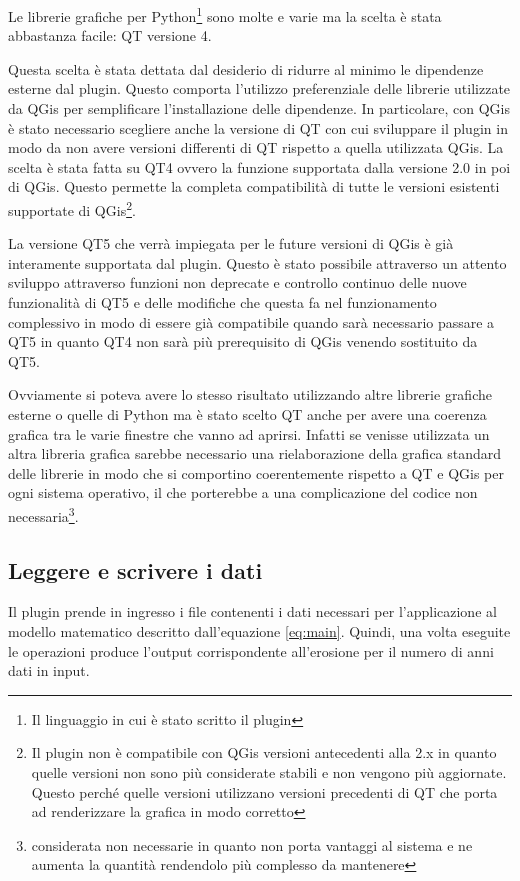 Le librerie grafiche per Python\footnote{Il linguaggio in cui è stato scritto il plugin} sono molte e varie ma la scelta è stata abbastanza facile: QT versione 4.

Questa scelta è stata dettata dal desiderio di ridurre al minimo le dipendenze esterne dal plugin. Questo comporta l'utilizzo preferenziale delle librerie utilizzate da QGis per semplificare l'installazione delle dipendenze. In particolare, con QGis è stato necessario scegliere anche la versione di QT con cui sviluppare il plugin in modo da non avere versioni differenti di QT rispetto a quella utilizzata QGis. La scelta è stata fatta su QT4 ovvero la funzione supportata dalla versione 2.0 in poi di QGis.  Questo permette la completa compatibilità di tutte le versioni esistenti supportate di QGis\footnote{Il plugin non è compatibile con QGis versioni antecedenti alla 2.x in quanto quelle versioni non sono più considerate stabili e non vengono più aggiornate. Questo perché quelle versioni utilizzano versioni precedenti di QT che porta ad renderizzare la grafica in modo corretto}.

La versione QT5 che verrà impiegata per le future versioni di QGis è già interamente supportata dal plugin. Questo è stato possibile attraverso un attento sviluppo attraverso funzioni non deprecate e controllo continuo delle nuove funzionalità di QT5 e delle modifiche che questa fa nel funzionamento complessivo in modo di essere già compatibile quando sarà necessario passare a QT5 in quanto QT4 non sarà più prerequisito di QGis venendo sostituito da QT5.

Ovviamente si poteva avere lo stesso risultato utilizzando altre librerie grafiche esterne o quelle di Python ma è stato scelto QT anche per avere una coerenza grafica tra le varie finestre che vanno ad aprirsi. Infatti se venisse utilizzata un altra libreria grafica sarebbe necessario una rielaborazione della grafica standard delle librerie in modo che si comportino coerentemente rispetto a QT e QGis per ogni sistema operativo, il che porterebbe a una complicazione del codice non necessaria\footnote{\egrave considerata non necessarie in quanto non porta vantaggi al sistema e ne aumenta la quantità rendendolo più complesso da mantenere}.

\subsection{Leggere e scrivere i dati}
Il plugin prende in ingresso i file contenenti i dati necessari per l'applicazione al modello matematico descritto dall'equazione \ref{eq:main}. Quindi, una volta eseguite le operazioni produce l'output corrispondente all'erosione per il numero di anni dati in input.

